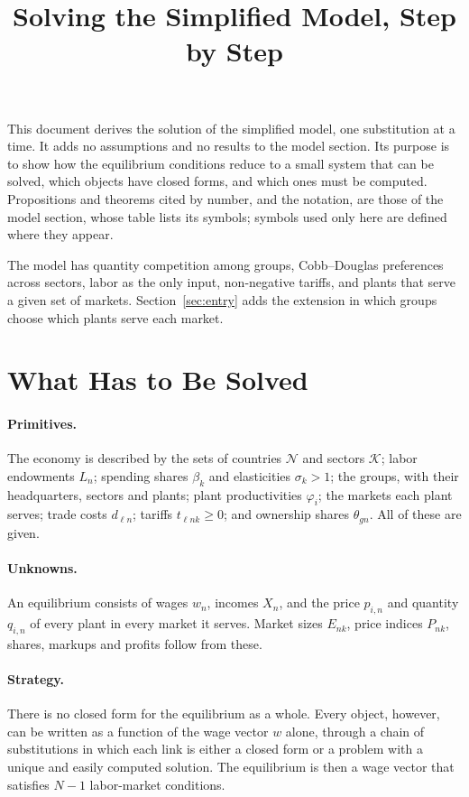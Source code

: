 \documentclass[11pt]{article}
\title{Solving the Simplified Model, Step by Step}
\author{}
\date{}
\newcommand{\cN}{\mathcal N}
\newcommand{\cK}{\mathcal K}
\begin{document}
\maketitle

\noindent This document derives the solution of the simplified model, one substitution
at a time. It adds no assumptions and no results to the model section. Its purpose is
to show how the equilibrium conditions reduce to a small system that can be solved,
which objects have closed forms, and which ones must be computed. Propositions and
theorems cited by number, and the notation, are those of the model section, whose table
lists its symbols; symbols used only here are defined where they appear.

The model has quantity competition among groups, Cobb--Douglas preferences across
sectors, labor as the only input, non-negative tariffs, and plants that serve a given
set of markets. Section~\ref{sec:entry} adds the extension in which groups choose which
plants serve each market.

\tableofcontents

\setcounter{section}{-1}
\section{What Has to Be Solved}
\label{sec:overview}

\paragraph{Primitives.} The economy is described by the sets of countries $\cN$ and
sectors $\cK$; labor endowments $L_n$; spending shares $\beta_k$ and elasticities
$\sigma_k>1$; the groups, with their headquarters, sectors and plants; plant
productivities $\varphi_i$; the markets each plant serves; trade costs $d_{\ell n}$;
tariffs $t_{\ell nk}\ge0$; and ownership shares $\theta_{gn}$. All of these are given.

\paragraph{Unknowns.} An equilibrium consists of wages $w_n$, incomes $X_n$, and the
price $p_{i,n}$ and quantity $q_{i,n}$ of every plant in every market it serves.
Market sizes $E_{nk}$, price indices $P_{nk}$, shares, markups and profits follow from
these.

\paragraph{Strategy.} There is no closed form for the equilibrium as a whole. Every
object, however, can be written as a function of the wage vector $w$ alone, through a
chain of substitutions in which each link is either a closed form or a problem with a
unique and easily computed solution. The equilibrium is then a wage vector that
satisfies $N-1$ labor-market conditions.
\end{document}
